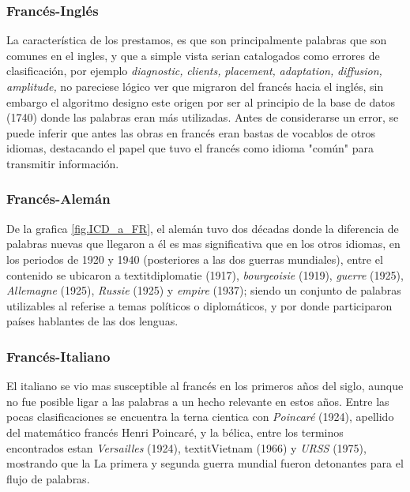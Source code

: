 \subsubsection*{Francés-Inglés}%

La característica de los prestamos, es que son principalmente palabras que son comunes en el ingles, y que a simple vista serian catalogados como errores de clasificación, por ejemplo  \textit{diagnostic,} \textit{clients,} \textit{placement,} \textit{adaptation,} \textit{diffusion,} \textit{amplitude,} no pareciese lógico ver que migraron del francés hacia el inglés, sin embargo el algoritmo designo este origen por ser al principio de la base de datos (1740)  donde las palabras eran más utilizadas.  Antes de considerarse un error, se puede inferir que antes las obras en francés eran bastas de vocablos de otros idiomas, destacando el papel que tuvo el francés como idioma "común" para transmitir información. 


\subsubsection*{Francés-Alemán}%

De la grafica \ref{fig.ICD_a_FR}, el alemán tuvo dos décadas donde la diferencia de palabras nuevas que llegaron a él es mas significativa que en los otros idiomas, en los periodos de 1920 y 1940  (posteriores a las dos guerras mundiales), entre el contenido se ubicaron a  textit{diplomatie} (1917), \textit{bourgeoisie} (1919),  \textit{guerre} (1925), \textit{Allemagne} (1925), \textit{Russie} (1925) y \textit{empire} (1937); siendo un conjunto de palabras utilizables al referise a temas políticos  o diplomáticos, y por donde participaron países hablantes de las dos lenguas. 


\subsubsection*{Francés-Italiano}%

El italiano se vio mas susceptible al francés en los primeros años del siglo, aunque no fue posible ligar a las palabras a un hecho relevante en estos años. Entre las pocas clasificaciones se encuentra la terna cientica con \textit{Poincaré} (1924), apellido del matemático francés Henri Poincaré, y la bélica,  entre los terminos encontrados estan \textit{Versailles} (1924), textit{Vietnam} (1966)  y \textit{URSS} (1975), mostrando que la  La primera y segunda guerra mundial fueron detonantes para el flujo de palabras.


